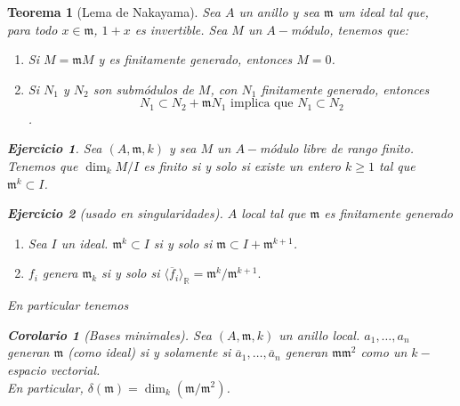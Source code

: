 \documentclass[12pt]{book}
\newtheorem{teo}{Teorema}
\newtheorem{ex}{Ejercicio}
\newtheorem{cor}{Corolario}
\newcommand{\mm}{\mathfrak{m}}
\begin{document}
\begin{teo}[Lema de Nakayama]
	
	Sea $A$ un anillo y sea $\mathfrak{m}$ um ideal tal que, para todo $x\in \mathfrak{m}$, $1+x$ es invertible. Sea $M$ un $A-$módulo, tenemos que:
	\begin{enumerate}
		\item Si $M= \mathfrak{m} M$ y es finitamente generado, entonces $M=0$.
		\item Si $N_1$ y $N_2$ son submódulos de $M$, con $N_1$ finitamente generado, entonces $$N_1 \subset N_2 + \mathfrak{m} N_1 \mbox{ implica que } N_1\subset N_2$$.
	\end{enumerate}
	

\begin{ex}
Sea $(A, \mathfrak{m},k)$ y sea $M$ un $A-$módulo libre de rango finito. Tenemos que $\dim _k M/I$ es finito si y solo si existe un entero $k\geq 1$ tal que $\mathfrak{m} ^k \subset I$.
\end{ex}

\begin{ex}[usado en singularidades] $A$ local tal que $\mm$ es finitamente generado
\begin{enumerate}
\item Sea $I$ un ideal. $ \mm ^k \subset I  $ si y solo si $\mm \subset I + \mm ^{k+1}$.
\item $f_i$ genera $\mm_k $ si y solo si $ \langle \overline{f}_i \rangle _{\mathbb{R}} = \mm ^k / \mm^{k+1}.$



\end{enumerate}
\end{ex}
	
	
	
En particular tenemos
	\begin{cor}[Bases minimales]
		Sea $(A, \mathfrak{m},k)$ un anillo local. $ a_1 ,  \ldots , a_n$ generan $\mathfrak{m}$ (como ideal) si y solamente si $\overline{a}_1, \ldots , \overline{a}_n$ generan $\mathfrak{m} \mathfrak{m}^2 $ como un $k-$espacio vectorial.\\
		En particular, $\delta (\mathfrak{m}) = \dim_k (\mathfrak{m} / \mathfrak{m}^2)$.
	\end{cor}	
	
\end{teo}
\end{document}
